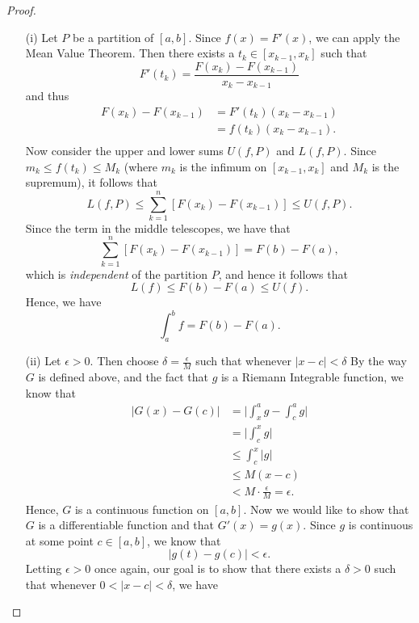\begin{proof}
\begin{enumerate}
	\item[(i)] Let \( P  \) be a partition of \( [a,b]  \). Since \( f(x) = F'(x)  \), we can apply the Mean Value Theorem. Then there exists a \( t_{k } \in [x_{k-1}, x_{k }] \) such that 
		\[  F'(t_{k } ) =  \frac{ F(x_{k } ) - F(x_{k-1})}{  x_{k} - x_{k-1} }\] and thus 
		\begin{align*}
		    F(x_{k } ) - F(x_{k-1}) &= F'(t_{ k }) ( x_{k } - x_{k-1})  \\
									&= f(t_{k }) (x_{k} - x_{k-1}). \\
		\end{align*}
		Now consider the upper and lower sums \( U(f,P)  \) and \( L(f,P)  \). Since \( m_{k } \leq f(t_{k }) \leq M_{k }   \) (where \( m_{k }  \) is the infimum on \( [ x_{k-1}, x_{k }]  \) and \( M_{k }  \) is the supremum), it follows that 
		\[  L(f,P) \leq \sum_{ k=1 }^{ n } [F(x_{k }) - F(x_{k-1})] \leq U(f,P).\]
		Since the term in the middle telescopes, we have that 
		\[  \sum_{ k=1 }^{ n } [F(x_{k}) - F(x_{k-1})] = F(b) - F(a),  \]
		which is \textit{independent} of the partition \( P  \), and hence it follows that 
		\[  L(f) \leq F(b) - F(a) \leq U(f). \]
		Hence, we have 
		\[  \int_{ a }^{ b } f = F(b) - F(a). \]
	\item[(ii)] Let \( \epsilon > 0 \). Then choose \( \delta = \frac{ \epsilon  }{ M  }   \) such that whenever \( | x - c  | < \delta \) By the way \( G  \) is defined above, and the fact that \( g  \) is a Riemann Integrable function,  we know that
		\begin{align*}
		    \Big| G(x) - G(c)  \Big| &= \Big| \int_{ x }^{ a } g - \int_{ c }^{ a } g  \Big|  \\
									 &= \Big| \int_{ c }^{ x } g  \Big| \\
									 &\leq \int_{ c }^{ x } | g |  \\
									 &\leq M (x - c )  \\
									 &< M \cdot \frac{ \epsilon  }{ M  } = \epsilon.
		\end{align*}
		Hence, \( G  \) is a continuous function on \( [a,b]  \). Now we would like to show that \( G  \) is a differentiable function and that \( G'(x) = g(x)  \). Since \( g  \) is continuous at some point \( c \in [a,b]  \), we know that 
		\[  | g(t) - g(c)  | < \epsilon. \] Letting \( \epsilon > 0   \) once again, our goal is to show that there exists a \( \delta > 0   \) such that whenever \(0  < | x  -c  |  < \delta \), we have

\end{enumerate}
\end{proof}
